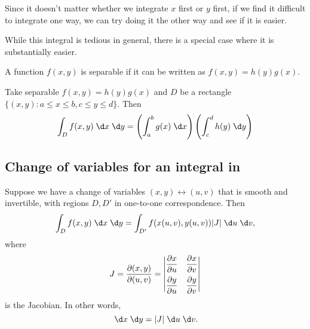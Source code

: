 \documentclass[a4paper]{article}
\begin{document}
Since it doesn't matter whether we integrate $x$ first or $y$ first, if we find it difficult to integrate one way, we can try doing it the other way and see if it is easier.

While this integral is tedious in general, there is a special case where it is substantially easier.
\begin{defi}
  A function $f(x, y)$ is separable if it can be written as $f(x, y) = h(y)g(x)$.
\end{defi}

\begin{prop}
  Take separable $f(x, y) = h(y)g(x)$ and $D$ be a rectangle $\{(x, y): a\leq x\leq b, c\leq y \leq d\}$. Then
  \[
    \int_Df(x, y)\;\d x\;\d y = \left(\int_a^b g(x)\;\d x\right)\left(\int_c^d h(y)\;\d y\right)
  \]
\end{prop}

\subsection{Change of variables for an integral in }
\begin{prop}
  Suppose we have a change of variables $(x, y)\leftrightarrow (u, v)$ that is smooth and invertible, with regions $D, D'$ in one-to-one correspondence. Then
  \[
    \int_D f(x, y)\;\d x\;\d y = \int_{D'} f(x(u, v), y(u, v))|J|\;\d u\;\d v,
  \]
  where
  \[
    J = \frac{\partial (x, y)}{\partial (u, v)} =
    \begin{vmatrix}
      \dfrac{\partial x}{\partial u} & \dfrac{\partial x}{\partial v}\vspace{5pt}\\
      \dfrac{\partial y}{\partial u} & \dfrac{\partial y}{\partial v}\\
    \end{vmatrix}
  \]
  is the Jacobian. In other words,
  \[
    \;\d x\;\d y = |J|\;\d u\;\d v.
  \]
\end{prop}
\end{document}
